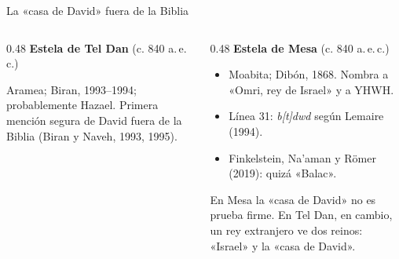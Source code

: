 \begin{frame}{La «casa de David» fuera de la Biblia}
\begin{columns}[T,onlytextwidth]
\begin{column}{0.48\textwidth}\footnotesize
\textbf{\textcolor{ladrillo}{Estela de Tel Dan}} (c. 840 a.\,e.\,c.)\par\smallskip
Aramea; Biran, 1993--1994; probablemente Hazael. Primera mención segura de David fuera de la Biblia (Biran y Naveh, 1993, 1995).\par\smallskip
\centering
{}
\end{column}
\begin{column}{0.48\textwidth}\footnotesize
\textbf{\textcolor{ladrillo}{Estela de Mesa}} (c. 840 a.\,e.\,c.)
\begin{itemize}
\item Moabita; Dibón, 1868. Nombra a «Omri, rey de Israel» y a YHWH.
\item Línea 31: \emph{b[t]dwd} según Lemaire (1994).
\item Finkelstein, Na'aman y Römer (2019): quizá «Balac».
\end{itemize}
\begin{notalam}
En Mesa la «casa de David» no es prueba firme. En Tel Dan, en cambio, un rey extranjero ve dos reinos: «Israel» y la «casa de David».
\end{notalam}
\end{column}
\end{columns}
\end{frame}

